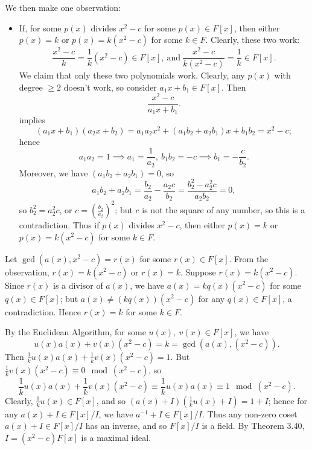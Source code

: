 \documentclass{homework}
\begin{document}
\begin{solution}
\begin{enumerate}[label=(\alph*)]
      We then make one observation:
      \begin{itemize}
        \item If, for some $p(x)$ divides $x^2-c$ for some $p(x)\in F[x]$, then either $p(x)=k$ or
          $p(x)=k(x^2-c)$ for some $k\in F$. Clearly, these two work: \[
            \frac{x^2-c}{k}=\frac{1}{k}(x^2-c)\in F[x], ~\text{and}~
            \frac{x^2-c}{k(x^2-c)}=\frac{1}{k}\in F[x]
          .\] We claim that only these two polynomials work. Clearly, any $p(x)$ with degree $\ge 2$
          doesn't work, so consider $a_1x+b_1\in F[x]$. Then \[
            \frac{x^2-c}{a_1x+b_1}
          .\] implies \[
            (a_1x+b_1)(a_2x+b_2)=a_1a_2x^2+(a_1b_2+a_2b_1)x+b_1b_2=x^2-c
          ;\] hence \[
            a_1a_2=1 \implies a_1=\frac{1}{a_2},\ b_1b_2=-c\implies b_1=-\frac{c}{b_2}
          .\] Moreover, we have $(a_1b_2+a_2b_1)=0$, so \[
            a_1b_2+a_2b_1=\frac{b_2}{a_2}-\frac{a_2c}{b_2}=\frac{b_2^2-a_2^2c}{a_2b_2}=0
          ,\] so $b_2^2=a_2^2c$, or $c=\left( \frac{b_2}{a_2} \right)^2$; but $c$ is not the
          square of any number, so this is a contradiction. Thus if $p(x)$ divides $x^2-c$, then
          either $p(x)=k$ or $p(x)=k(x^2-c)$ for some $k\in F$.
      \end{itemize}
      Let $\gcd{(a(x),x^2-c)}=r(x)$ for some $r(x)\in F[x]$. From the observation, $r(x)=k(x^2-c)$
      or $r(x)=k$. Suppose $r(x)=k(x^2-c)$. Since $r(x)$ is a divisor of $a(x)$, we have
      $a(x)=kq(x)(x^2-c)$ for some $q(x)\in F[x]$; but $a(x)\neq (kq(x))(x^2-c)$ for any $q(x)\in
      F[x]$, a contradiction. Hence $r(x)=k$ for some $k\in F$.

      By the Euclidean Algorithm, for some $u(x),\ v(x)\in F[x]$, we have \[
        u(x)a(x)+v(x)(x^2-c)=k=\gcd{(a(x),(x^2-c))}
      .\] Then $\frac{1}{k}u(x)a(x)+\frac{1}{k}v(x)(x^2-c)=1$. But $\frac{1}{k}v(x)(x^2-c)\equiv
      0\mod{(x^2-c)}$, so \[
        \frac{1}{k}u(x)a(x)+\frac{1}{k}v(x)(x^2-c)\equiv \frac{1}{k}u(x)a(x)\equiv 1 \mod{(x^2-c)}
      .\] Clearly, $\frac{1}{k}u(x)\in F[x]$, and so $(a(x)+I)(\frac{1}{k}u(x)+I)=1+I$; hence for
      any $a(x)+I\in F[x] / I$, we have $a^{-1}+I\in F[x] / I$. Thus any non-zero coset $a(x)+I\in
      F[x] / I$ has an inverse, and so $F[x] / I$ is a field. By Theorem 3.40, $I=(x^2-c)F[x]$ is a
      maximal ideal.
  \end{enumerate}
\end{solution}
\end{document}
